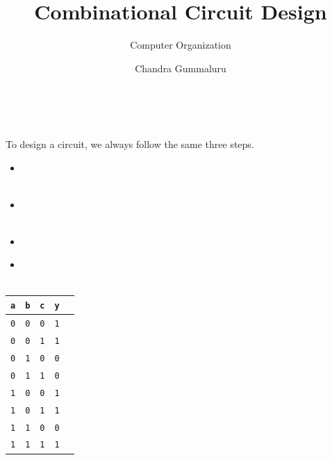 \documentclass[mathserif, handout]{beamer}
\title{Combinational Circuit Design}
\subtitle{Computer Organization}
\author[C. Gummaluru]{Chandra Gummaluru}
\institute[]{\url{chandra-gummaluru.github.io} }
\date[Computer Organization]{}
\newcommand{\ttab}[1]{\texttt{#1}}
\begin{document}
\begin{frame}
  \maketitle
\end{frame}
\begin{frame}
  \begin{center}
     \\[2mm]
  \end{center}
\end{frame}
\begin{frame}
  To design a circuit, we always follow the same three steps.\\[3mm]
  \begin{itemize}
    \item[(1)]  \\
           \\[2mm]
    \item[(2)]  \\
           \\[2mm]
    \item[(3)]  \\
  \end{itemize}
\end{frame}
\begin{frame}
\begin{itemize}
    \item[(1)]  \\
       \\[2mm]
\end{itemize}
  \begin{center}
    \renewcommand{\arraystretch}{1.15}
    \begin{tabular}{ccc|cl}
      \ttab{a} & \ttab{b} & \ttab{c} & \ttab{y} \\ \hline
      \ttab{0} & \ttab{0} & \ttab{0} & \ttab{1} \\
      \ttab{0} & \ttab{0} & \ttab{1} & \ttab{1} \\
      \ttab{0} & \ttab{1} & \ttab{0} & \ttab{0} \\
      \ttab{0} & \ttab{1} & \ttab{1} & \ttab{0} \\
      \ttab{1} & \ttab{0} & \ttab{0} & \ttab{1} \\
      \ttab{1} & \ttab{0} & \ttab{1} & \ttab{1} \\
      \ttab{1} & \ttab{1} & \ttab{0} & \ttab{0} \\
      \ttab{1} & \ttab{1} & \ttab{1} & \ttab{1} \\
    \end{tabular}
  \end{center}
\end{frame}
\end{document}
